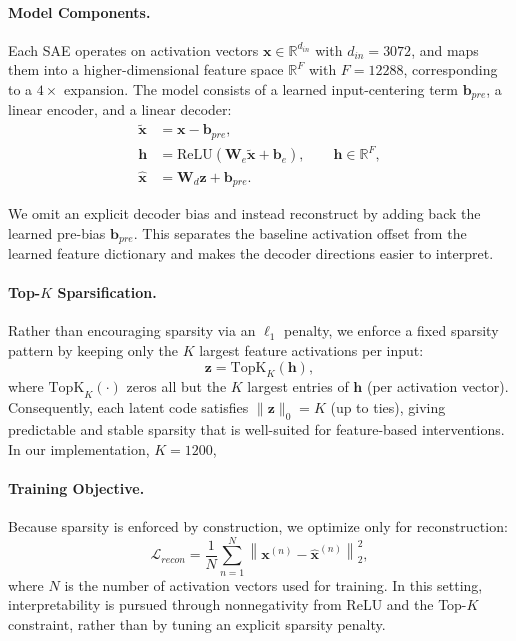 \documentclass{article}
\begin{document}
\paragraph{Model Components.}
Each SAE operates on activation vectors $\mathbf{x}\in\mathbb{R}^{d_{in}}$ with $d_{in}=3072$, and maps them into a higher-dimensional feature space $\mathbb{R}^{F}$ with $F=12288$, corresponding to a $4\times$ expansion. The model consists of a learned input-centering term $\mathbf{b}_{pre}$, a linear encoder, and a linear decoder:
\begin{align}
\tilde{\mathbf{x}} &= \mathbf{x} - \mathbf{b}_{pre}, \\
\mathbf{h} &= \mathrm{ReLU}\!\left(\mathbf{W}_e \tilde{\mathbf{x}} + \mathbf{b}_e\right), \qquad \mathbf{h}\in\mathbb{R}^{F}, \\
\hat{\mathbf{x}} &= \mathbf{W}_d \mathbf{z} + \mathbf{b}_{pre}.
\end{align}

We omit an explicit decoder bias and instead reconstruct by adding back the learned pre-bias $\mathbf{b}_{pre}$. This separates the baseline activation offset from the learned feature dictionary and makes the decoder directions easier to interpret.

\paragraph{Top-$K$ Sparsification.}
Rather than encouraging sparsity via an $\ell_1$ penalty, we enforce a fixed sparsity pattern by keeping only the $K$ largest feature activations per input:
\begin{equation}
\mathbf{z} = \mathrm{TopK}_K(\mathbf{h}),
\end{equation}
where $\mathrm{TopK}_K(\cdot)$ zeros all but the $K$ largest entries of $\mathbf{h}$ (per activation vector). Consequently, each latent code satisfies $\lVert \mathbf{z}\rVert_0 = K$ (up to ties), giving predictable and stable sparsity that is well-suited for feature-based interventions. In our implementation, $K = 1200$, 

\paragraph{Training Objective.}
Because sparsity is enforced by construction, we optimize only for reconstruction:
\begin{equation}
\mathcal{L}_{recon} = \frac{1}{N}\sum_{n=1}^{N}\left\lVert \mathbf{x}^{(n)} - \hat{\mathbf{x}}^{(n)} \right\rVert_2^2,
\end{equation}
where $N$ is the number of activation vectors used for training. In this setting, interpretability is pursued through nonnegativity from ReLU and the Top-$K$ constraint, rather than by tuning an explicit sparsity penalty.
\end{document}
